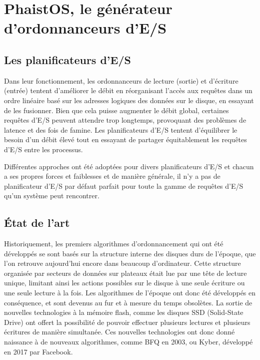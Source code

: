 \section{PhaistOS, le générateur d'ordonnanceurs d'E/S}
\label{context}

\subsection{Les planificateurs d'E/S}

Dans leur fonctionnement, les ordonnanceurs de lecture (sortie) et d'écriture 
(entrée) tentent d'améliorer le débit en réorganisant l'accès aux requêtes dans 
un ordre linéaire basé sur les adresses logiques des données sur le disque, en 
essayant de les fusionner. Bien que cela puisse augmenter le débit global, 
certaines requêtes d'E/S peuvent attendre trop longtemps, provoquant des 
problèmes de latence et des fois de famine. Les planificateurs d'E/S tentent 
d'équilibrer le besoin d'un débit élevé tout en essayant de partager 
équitablement les requêtes d'E/S entre les processus.

Différentes approches ont été adoptées pour divers planificateurs d'E/S et 
chacun a ses propres forces et faiblesses et de manière générale, il n'y a pas 
de planificateur d'E/S par défaut parfait pour toute la gamme de requêtes d'E/S 
qu'un système peut rencontrer. 

\subsection{État de l'art}

Historiquement, les premiers algorithmes d'ordonnancement qui ont été 
développés se sont basés sur la structure interne des disques durs de l'époque, 
que l'on retrouve aujourd'hui encore dans beaucoup d'ordinateur. Cette 
structure organisée par secteurs de données sur plateaux était lue par une tête 
de lecture unique, limitant ainsi les actions possibles sur le disque à une 
seule écriture ou une seule lecture à la fois. Les algorithmes de l'époque ont 
donc été développés en conséquence, et sont devenus au fur et à mesure du 
temps obsolètes. La sortie de nouvelles technologies à la mémoire flash, comme 
les disques SSD (Solid-State Drive) ont offert la possibilité de pouvoir 
effectuer plusieurs lectures et plusieurs écritures de manière simultanée. Ces 
nouvelles technologies ont donc donné naissance à de nouveaux algorithmes, 
comme BFQ en 2003, ou Kyber, développé en 2017 par Facebook.

